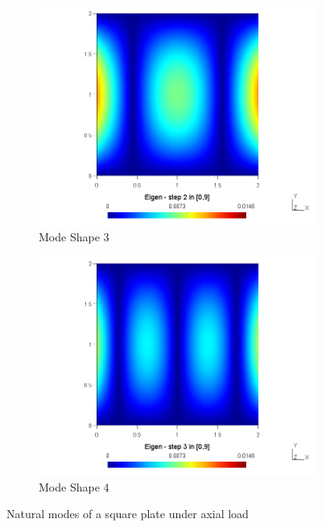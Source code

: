 \documentclass[main.tex]{subfiles}
\begin{document}
\begin{figure}[h!]
\begin{subfigure}{.49\textwidth}
\includegraphics[width=\linewidth,trim={4cm 0 4cm 0},clip]{images/VMP09/3.png}
\caption{Mode Shape 3}
\end{subfigure}\hfill
\begin{subfigure}{.49\textwidth}
\includegraphics[width=\linewidth,trim={4cm 0 4cm 0},clip]{images/VMP09/4.png}
\caption{Mode Shape 4}
\end{subfigure} 

\caption{Natural modes of a square plate under axial load}
\end{figure}
\end{document}
